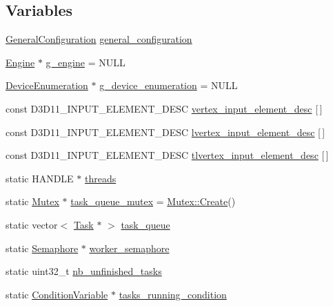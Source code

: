 \subsection*{Variables}
\begin{DoxyCompactItemize}
\item 
\hyperlink{structmage_1_1_general_configuration}{General\+Configuration} \hyperlink{namespacemage_a1f4290d574030d412ca0f2f51b1a2057}{general\+\_\+configuration}
\item 
\hyperlink{classmage_1_1_engine}{Engine} $\ast$ \hyperlink{namespacemage_a84bf83f1e8779d884452cdf08f56c19a}{g\+\_\+engine} = N\+U\+LL
\item 
\hyperlink{classmage_1_1_device_enumeration}{Device\+Enumeration} $\ast$ \hyperlink{namespacemage_a73e54b9b368875ed0281ced59e2fca7e}{g\+\_\+device\+\_\+enumeration} = N\+U\+LL
\item 
const D3\+D11\+\_\+\+I\+N\+P\+U\+T\+\_\+\+E\+L\+E\+M\+E\+N\+T\+\_\+\+D\+E\+SC \hyperlink{namespacemage_a8647e0bbbbe87e5c6d7a4d4622230119}{vertex\+\_\+input\+\_\+element\+\_\+desc} \mbox{[}$\,$\mbox{]}
\item 
const D3\+D11\+\_\+\+I\+N\+P\+U\+T\+\_\+\+E\+L\+E\+M\+E\+N\+T\+\_\+\+D\+E\+SC \hyperlink{namespacemage_ae6b56f20c8e8917ef1be8d9e4cef3ea3}{lvertex\+\_\+input\+\_\+element\+\_\+desc} \mbox{[}$\,$\mbox{]}
\item 
const D3\+D11\+\_\+\+I\+N\+P\+U\+T\+\_\+\+E\+L\+E\+M\+E\+N\+T\+\_\+\+D\+E\+SC \hyperlink{namespacemage_a0f27594da3814c163fe995326acf6c5e}{tlvertex\+\_\+input\+\_\+element\+\_\+desc} \mbox{[}$\,$\mbox{]}
\item 
static H\+A\+N\+D\+LE $\ast$ \hyperlink{namespacemage_a15e9f7d36194ec1b768a82a2294cce6c}{threads}
\item 
static \hyperlink{classmage_1_1_mutex}{Mutex} $\ast$ \hyperlink{namespacemage_a7de4544ddddcf8e0d54dbfdc0778f13f}{task\+\_\+queue\+\_\+mutex} = \hyperlink{classmage_1_1_mutex_a48d784fa6bffd4088d9f89a2a9cca84e}{Mutex\+::\+Create}()
\item 
static vector$<$ \hyperlink{classmage_1_1_task}{Task} $\ast$ $>$ \hyperlink{namespacemage_af4824558d428695e4661c5e7cdfa4419}{task\+\_\+queue}
\item 
static \hyperlink{classmage_1_1_semaphore}{Semaphore} $\ast$ \hyperlink{namespacemage_a17c3448f9fba7521d188d30bdfb77e33}{worker\+\_\+semaphore}
\item 
static uint32\+\_\+t \hyperlink{namespacemage_a390e8652d67667609daf3aa64e3c00a8}{nb\+\_\+unfinished\+\_\+tasks}
\item 
static \hyperlink{classmage_1_1_condition_variable}{Condition\+Variable} $\ast$ \hyperlink{namespacemage_a8c04b4285ebbc0fb416b1905c01cf149}{tasks\+\_\+running\+\_\+condition}
\end{DoxyCompactItemize}


